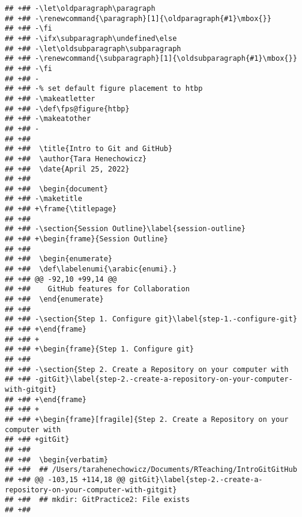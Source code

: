 \documentclass[ignorenonframetext,]{beamer}
\begin{document}
\begin{verbatim}
## +## -\let\oldparagraph\paragraph
## +## -\renewcommand{\paragraph}[1]{\oldparagraph{#1}\mbox{}}
## +## -\fi
## +## -\ifx\subparagraph\undefined\else
## +## -\let\oldsubparagraph\subparagraph
## +## -\renewcommand{\subparagraph}[1]{\oldsubparagraph{#1}\mbox{}}
## +## -\fi
## +## -
## +## -% set default figure placement to htbp
## +## -\makeatletter
## +## -\def\fps@figure{htbp}
## +## -\makeatother
## +## -
## +##  
## +##  \title{Intro to Git and GitHub}
## +##  \author{Tara Henechowicz}
## +##  \date{April 25, 2022}
## +##  
## +##  \begin{document}
## +## -\maketitle
## +## +\frame{\titlepage}
## +##  
## +## -\section{Session Outline}\label{session-outline}
## +## +\begin{frame}{Session Outline}
## +##  
## +##  \begin{enumerate}
## +##  \def\labelenumi{\arabic{enumi}.}
## +## @@ -92,10 +99,14 @@
## +##    GitHub features for Collaboration
## +##  \end{enumerate}
## +##  
## +## -\section{Step 1. Configure git}\label{step-1.-configure-git}
## +## +\end{frame}
## +## +
## +## +\begin{frame}{Step 1. Configure git}
## +##  
## +## -\section{Step 2. Create a Repository on your computer with
## +## -gitGit}\label{step-2.-create-a-repository-on-your-computer-with-gitgit}
## +## +\end{frame}
## +## +
## +## +\begin{frame}[fragile]{Step 2. Create a Repository on your computer with
## +## +gitGit}
## +##  
## +##  \begin{verbatim}
## +##  ## /Users/tarahenechowicz/Documents/RTeaching/IntroGitGitHub
## +## @@ -103,15 +114,18 @@ gitGit}\label{step-2.-create-a-repository-on-your-computer-with-gitgit}
## +##  ## mkdir: GitPractice2: File exists
## +##  \end{verbatim}
\end{document}
